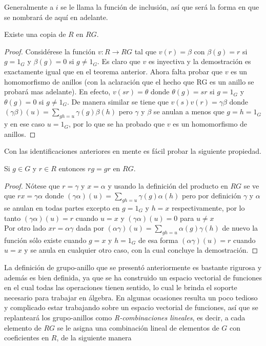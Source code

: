 Generalmente a $i$ se le llama la función de inclusión, así que será la forma en que se nombrará de aquí en adelante.

\begin{teorema}
Existe una copia de $R$ en $RG$.
\end{teorema}


\begin{proof}
Considérese la función $v \colon R \to RG$ tal que $v(r) = \beta$ con $\beta(g) = r$ si $ g = 1_G $ y $\beta(g)=0$ si $g \neq 1_G$. Es claro que $v$ es inyectiva y la demostración es exactamente igual que en el teorema anterior. Ahora falta probar que $v$ es un homomorfismo de anillos (con la aclaración que el hecho que RG es un anillo se probará mas adelante). En efecto, $v(sr)=\theta$ donde $\theta(g)=sr$ si $g=1_G$ y $\theta(g) = 0$ si $g \neq 1_G$. De manera similar se tiene que $v(s)v(r)=\gamma\beta$ donde $(\gamma\beta)(u)=\sum_{gh=u}\gamma(g)\beta(h) $ pero $\gamma $ y $\beta$ se anulan a menos que $g=h=1_G$ y en ese caso $u=1_G$, por lo que se ha probado que $v$ es un homomorfismo de anillos. \qedhere
\end{proof}

Con las identificaciones anteriores en mente es fácil probar la siguiente propiedad. 
\begin{propiedad}
Si $g \in G$ y $r \in R$ entonces $rg=gr$ en $RG$.
\end{propiedad}
 
\begin{proof}
Nótese que $r=\gamma$ y $x=\alpha$ y usando la definición del producto en $RG$ se ve que $rx=\gamma\alpha$ donde $(\gamma\alpha)(u)=\sum_{gh=u}\gamma(g) \alpha(h) $ pero por definición $\gamma$ y $\alpha$ se anulan en todas partes excepto en $g=1_G$ y $h=x$ respectivamente, por lo tanto $(\gamma\alpha)(u)=r$ cuando $u=x$ y $(\gamma\alpha)(u)=0$ para $u \neq x $ \\
Por otro lado $xr=\alpha\gamma$ dada por $(\alpha\gamma)(u)=\sum_{gh=u}\alpha(g)\gamma(h)$ de nuevo la función sólo existe cuando $g=x$ y $h=1_G$ de esa forma $(\alpha\gamma)(u)=r$ cuando $u=x$ y se anula en cualquier otro caso, con la cual concluye la demostración.  \qedhere
 \end{proof}

La definición de grupo-anillo que se presentó anteriormente es bastante rigurosa y además es bien definida, ya que se ha construido un espacio vectorial de funciones en el cual todas las operaciones tienen sentido, lo cual le brinda el soporte necesario para trabajar en álgebra. En algunas ocasiones resulta un poco tedioso y complicado estar trabajando sobre un espacio vectorial de funciones, así que se replanteará los grupo-anillos como \textit{R-combinaciones lineales}, es decir, a cada elemento de $RG$ se le asigna una combinación lineal de elementos de $G$ con coeficientes en $R$, de la siguiente manera


